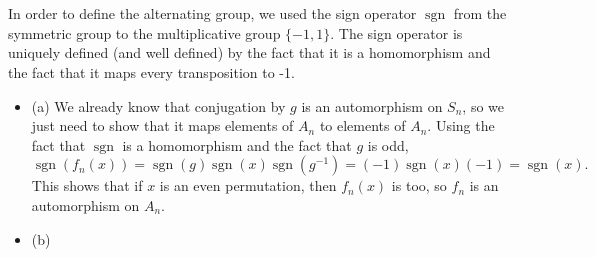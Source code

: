 \documentclass[12pt]{article}
\begin{document}
\section{}
\noindent{}\bigskip

In order to define the alternating group, we used the sign operator $\operatorname{sgn}$ from the symmetric group to the multiplicative group $\{-1, 1\}$. The sign operator is uniquely defined (and well defined) by the fact that it is a homomorphism and the fact that it maps every transposition to -1.
\begin{itemize}
    \item (a) We already know that conjugation by $g$ is an automorphism on $S_n$, so we just need to show that it maps elements of $A_n$ to elements of $A_n$. Using the fact that $\operatorname{sgn}$ is a homomorphism and the fact that $g$ is odd,
        \[ \operatorname{sgn}(f_n(x)) = \operatorname{sgn}(g) \operatorname{sgn}(x) \operatorname{sgn} (g^{-1}) = (-1) \operatorname{sgn}(x) (-1) = \operatorname{sgn}(x). \]
        This shows that if $x$ is an even permutation, then $f_n(x)$ is too, so $f_n$ is an automorphism on $A_n$.
    \item (b)
\end{itemize}

\section{}
\noindent{}\bigskip
\end{document}
